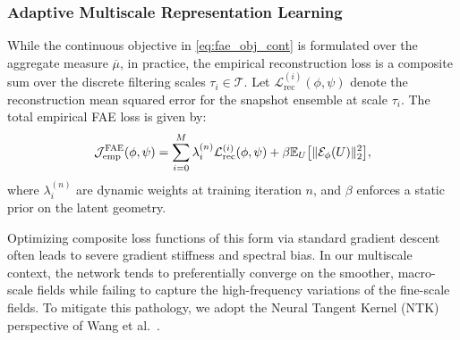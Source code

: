 \documentclass[review,onefignum,onetabnum]{siamart250211}
\newcommand{\E}{\mathbb{E}}
\newcommand{\1}{\mathbf{1}}
\newcommand{\cJ}{\mathcal{J}}
\newcommand{\cE}{\mathcal{E}}
\begin{document}
\subsubsection{Adaptive Multiscale Representation Learning}
\label{sec:ntk_weighting}

While the continuous objective in \eqref{eq:fae_obj_cont} is formulated over the aggregate measure $\overline{\mu}$, in practice, the empirical reconstruction loss is a composite sum over the discrete filtering scales $\tau_i \in \mathcal{T}$. Let $\mathcal{L}_{\mathrm{rec}}^{(i)}(\phi, \psi)$ denote the reconstruction mean squared error for the snapshot ensemble at scale $\tau_i$. The total empirical FAE loss is given by:
\begin{equation}
\cJ_{\mathrm{emp}}^{\mathrm{\textsc{FAE}}}(\phi,\psi) = \sum_{i=0}^M \lambda_i^{(n)} \mathcal{L}_{\mathrm{rec}}^{(i)}(\phi, \psi) + \beta \E_{U}\big[\|\cE_\phi(U)\|_2^2\big],
\label{eq:fae_discrete_loss}
\end{equation}
where $\lambda_i^{(n)}$ are dynamic weights at training iteration $n$, and $\beta$ enforces a static prior on the latent geometry.

Optimizing composite loss functions of this form via standard gradient descent often leads to severe gradient stiffness and spectral bias. In our multiscale context, the network tends to preferentially converge on the smoother, macro-scale fields while failing to capture the high-frequency variations of the fine-scale fields. To mitigate this pathology, we adopt the Neural Tangent Kernel (NTK) perspective of Wang et al.~\cite{wang2022pinnsntk}.
\end{document}
